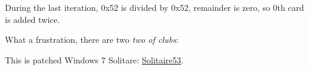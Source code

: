 During the last iteration, 0x52 is divided by 0x52, remainder is zero, so 0th card is added twice.

What a frustration, there are two \textit{two of clubs}:

\begin{figure}[H]
\centering
{}
\end{figure}

This is patched Windows 7 Solitare:
\href{https://github.com/DennisYurichev/RE-for-beginners/blob/master/examples/solitaire/53/Solitaire53.exe}{Solitaire53}.

